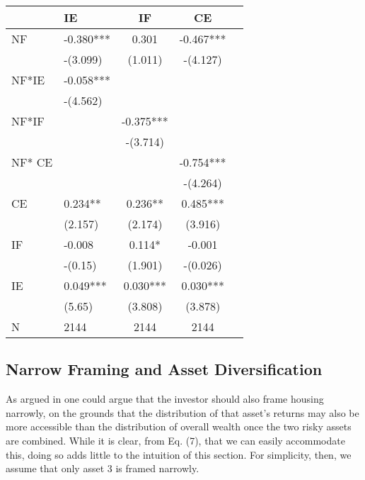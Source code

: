 \documentclass[ukenglish,nottitlepage,thmsb,11pt,letterpaper]{article}
\begin{document}
\begin{spacing}{1}
\begin{table}[H]
	\begin{tabular*}{\textwidth}{l @{\extracolsep{\fill}} lccc}
	    \toprule
	    & \textbf{IE}  & \textbf{IF}  & \textbf{CE} \\
	    \midrule
	    NF           & -0.380***       & 0.301        & -0.467*** \\
	    & -(3.099)     & (1.011)      & -(4.127) \\
	    NF*IE        & -0.058***       &              &  \\
	    & -(4.562)     &              &  \\
	    NF*IF        &              & -0.375***       &  \\
	    &              & -(3.714)     &  \\
	    NF* CE       &              &              & -0.754*** \\
	    &              &              & -(4.264) \\
	    CE           & 0.234**        & 0.236**        & 0.485*** \\
	    & (2.157)      & (2.174)      & (3.916) \\
	    IF           & -0.008       & 0.114*        & -0.001 \\
	    & -(0.15)      & (1.901)      & -(0.026) \\

	    IE           & 0.049***        & 0.030***        & 0.030*** \\
	    & (5.65)       & (3.808)      & (3.878) \\
	    \midrule
	    N            & 2144         & 2144         & 2144 \\
	    \bottomrule
	\end{tabular*}%
	\label{ddd}%
\end{table}%
\end{spacing}

 \subsection{Narrow Framing and Asset Diversification}
 
As argued in \citet{Barberis2009} one could argue that the investor should also frame housing narrowly, on the grounds that the distribution of that asset’s returns may also be more accessible than the distribution of overall wealth once the two risky assets are combined. While it is clear, from Eq. (7), that we can easily accommodate this, doing so adds little to the intuition of this section. For simplicity, then, we assume that only asset 3 is framed narrowly.
 
\end{document}
